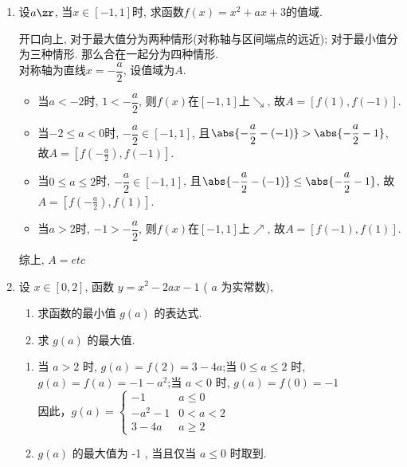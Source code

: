 \begin{enumerate}
\item 设$a\zr$, 当$x\in[-1,1]$时, 求函数$f(x)=x^2+ax+3$的值域. 
\begin{jieda}
开口向上, 对于最大值分为两种情形(对称轴与区间端点的远近); 对于最小值分为三种情形. 那么合在一起分为四种情形. \\
对称轴为直线$x=-\dfrac{a}{2}$, 设值域为$A$. 
\begin{itemize}
\item 当$a<-2$时, $1<-\dfrac{a}{2}$, 则$f(x)$在$[-1,1]$上$\searrow$, 故$A=[f(1),f(-1)]$. 
\item 当$-2\leq a<0$时, $-\dfrac{a}{2}\in[-1,1]$, 且$\abs{-\dfrac{a}{2}-(-1)}>\abs{-\dfrac{a}{2}-1}$, 故$A=[f(-\frac{a}{2}),f(-1)]$. 
\item 当$0\leq a\leq 2$时, $-\dfrac{a}{2}\in[-1,1]$, 且$\abs{-\dfrac{a}{2}-(-1)}\leq\abs{-\dfrac{a}{2}-1}$, 故$A=[f(-\frac{a}{2}),f(1)]$. 
\item 当$a>2$时, $-1>-\dfrac{a}{2}$, 则$f(x)$在$[-1,1]$上$\nearrow$, 故$A=[f(-1),f(1)]$. 
\end{itemize}
综上, $A=etc$
\end{jieda}
\begin{vspace_}
\vsp[5]
\end{vspace_}



\item 设 $x \in[0,2]$, 函数 $y=x^2-2 a x-1$ ( $a$ 为实常数),
\begin{enumerate}
    \item 求函数的最小值 $g(a)$ 的表达式.
    \item 求 $g(a)$ 的最大值.
\end{enumerate}
\begin{jieda}
\begin{enumerate}
\item 当 $a>2$ 时, $g(a)=f(2)=3-4 a$;当 $0 \leqslant a \leqslant 2$ 时, $g(a)=f(a)=-1-a^2$;当 $a<0$ 时, $g(a)=f(0)=-1$ \\
因此，$g(a) = \left \{ \begin{array}{cc}
    -1 & a \leq 0 \\
    -a^2 - 1 & 0 < a < 2 \\
    3-4a & a \geq 2
\end{array} \right.$
\item $g(a)$ 的最大值为 -1 , 当且仅当 $a \leqslant 0$ 时取到.
\end{enumerate}
\end{jieda}
\begin{vspace_}
\vsp[5]
\end{vspace_}



\end{enumerate}
